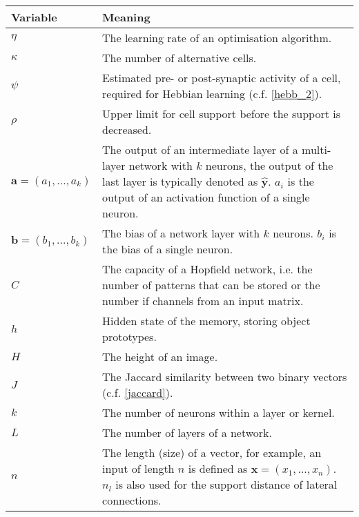 \begin{tabular}{ p{3cm} p{11cm} }
	\textbf{Variable} & \textbf{Meaning}\\
	\hline
	$\eta$ & The learning rate of an optimisation algorithm.\\
    $\kappa$ & The number of alternative cells.\\
    $\psi$ & Estimated pre- or post-synaptic activity of a cell, required for Hebbian learning (c.f. \eqref{hebb_2}).\\
    $\rho$ & Upper limit for cell support before the support is decreased.\\
	$\boldsymbol{a} = (a_1, ..., a_k)$ & The output of an intermediate layer of a multi-layer network with $k$ neurons, the output of the last layer is typically denoted as $\boldsymbol{\hat{y}}$. $a_i$ is the output of an activation function of a single neuron.\\
	$\boldsymbol{b} = (b_1, ..., b_k)$ & The bias of a network layer with 
    $k$ neurons. $b_i$ is the bias of a single neuron.\\
    $C$ & The capacity of a Hopfield network, i.e. the number of patterns that can be stored or the number if channels from an input matrix.\\
    $h$ & Hidden state of the memory, storing object prototypes.\\
    $H$ & The height of an image.\\
    $J$ & The Jaccard similarity between two binary vectors (c.f. \eqref{jaccard}).\\
    $k$ & The number of neurons within a layer or kernel.\\
    $L$ & The number of layers of a network.\\
    $n$ & The length (size) of a vector, for example, an input of length $n$ is defined as $\boldsymbol{x} = (x_1, ..., x_n)$. $n_l$ is also used for the support distance of lateral connections.\\


 \end{tabular}
 
